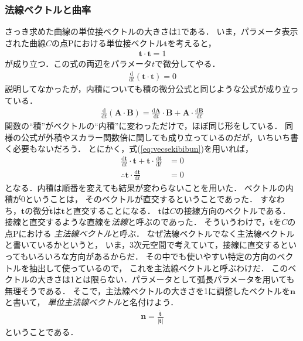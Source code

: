 \subsubsection{法線ベクトルと曲率}
さっき求めた曲線の単位接ベクトルの大きさは1である．
いま，パラメータ表示された曲線$C$の点Pにおける単位接ベクトル$\bm{t}$を考えると，
\begin{align*}
\bm{t} \cdot \bm{t} =1
\end{align*}
が成り立つ．この式の両辺をパラメータ$t$で微分してやる．
\begin{align*}
\frac{ \mathrm{d} } {\mathrm{d} t} ( \bm{t} \cdot \bm{t} ) =0
\end{align*}
説明してなかったが，内積についても積の微分公式と同じような公式が成り立っている．
\begin{align}
\frac{ \mathrm{d} } {\mathrm{d} t } (\bm{A} \cdot \bm{B} ) 
= \frac{ \mathrm{d} \bm{A} } { \mathrm{d} t} \cdot \bm{B}
+ \bm{A} \cdot \frac{ \mathrm{d} \bm{B} } { \mathrm{d} t } 
\label{eq:vecsekibibun}
\end{align} 
関数の``積''がベクトルの``内積''に変わっただけで，ほぼ同じ形をしている．
同様の公式が外積やスカラー関数倍に関しても成り立っているのだが，いちいち書く必要もないだろう．
とにかく，式(\ref{eq:vecsekibibun})を用いれば，
\begin{align*}
\frac{ \mathrm{d} \bm{t} } {\mathrm{d} t} \cdot \bm{t} 
+ \bm{t} \cdot \frac{ \mathrm{d} \bm{t} } {\mathrm{d} t} & = 0 \\
\therefore \bm{t} \cdot \frac{ \mathrm{d} \bm{t} } {\mathrm{d} t } & = 0
\end{align*}
となる．内積は順番を変えても結果が変わらないことを用いた．
ベクトルの内積が0ということは，
そのベクトルが直交するということであった．
すなわち，$\bm{t}$の微分$\dot{ \bm{t} }$は$\bm{t}$と直交することになる．
$\bm{t}$は$C$の接線方向のベクトルである．
接線と直交するような直線を\emph{法線}と呼ぶのであった．
そういうわけで，$\dot { \bm{t} }$を$C$の点Pにおける
\emph{主法線ベクトル}と呼ぶ．
なぜ法線ベクトルでなく主法線ベクトルと書いているかというと，
いま，3次元空間で考えていて，接線に直交するといってもいろいろな方向があるからだ．
その中でも使いやすい特定の方向のベクトルを抽出して使っているので，
これを主法線ベクトルと呼ぶわけだ．
このベクトルの大きさは1とは限らない．パラメータとして弧長パラメータを用いても無理そうである．
そこで，主法線ベクトルの大きさを1に調整したベクトルを$\bm{n}$と書いて，
\emph{単位主法線ベクトル}と名付けよう．
\begin{align}
\bm{n} = \frac{ \dot{ \bm{t} } } { \lvert \dot { \bm{t} } \rvert}
\label{eq:syuhousen}
\end{align}
ということである．

